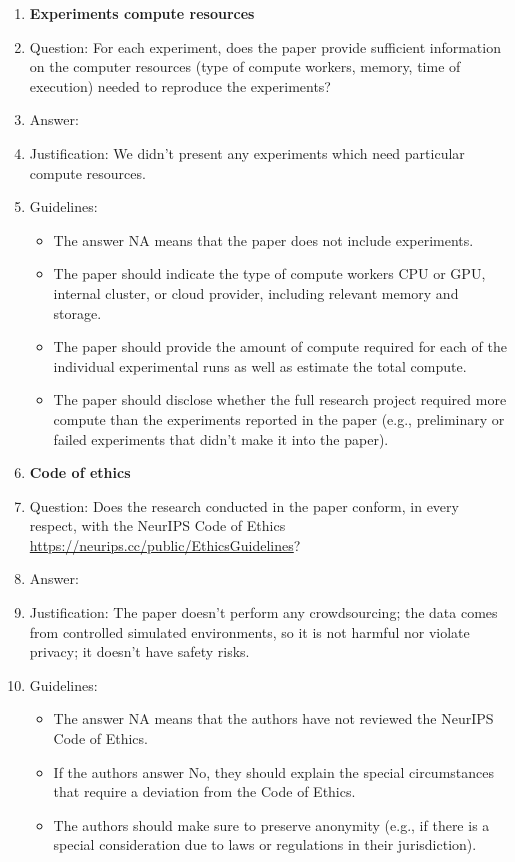 \documentclass{article}
\begin{document}
\begin{enumerate}
\item {\bf Experiments compute resources}
    \item[] Question: For each experiment, does the paper provide sufficient information on the computer resources (type of compute workers, memory, time of execution) needed to reproduce the experiments?
    \item[] Answer: \answerNA{} %
    \item[] Justification: We didn't present any experiments which need particular compute resources.
    \item[] Guidelines:
    \begin{itemize}
        \item The answer NA means that the paper does not include experiments.
        \item The paper should indicate the type of compute workers CPU or GPU, internal cluster, or cloud provider, including relevant memory and storage.
        \item The paper should provide the amount of compute required for each of the individual experimental runs as well as estimate the total compute. 
        \item The paper should disclose whether the full research project required more compute than the experiments reported in the paper (e.g., preliminary or failed experiments that didn't make it into the paper). 
    \end{itemize}
    
\item {\bf Code of ethics}
    \item[] Question: Does the research conducted in the paper conform, in every respect, with the NeurIPS Code of Ethics \url{https://neurips.cc/public/EthicsGuidelines}?
    \item[] Answer: \answerYes{} %
    \item[] Justification: The paper doesn't perform any crowdsourcing; the data comes from controlled simulated environments, so it is not harmful nor violate privacy; it doesn't have safety risks.
    \item[] Guidelines:
    \begin{itemize}
        \item The answer NA means that the authors have not reviewed the NeurIPS Code of Ethics.
        \item If the authors answer No, they should explain the special circumstances that require a deviation from the Code of Ethics.
        \item The authors should make sure to preserve anonymity (e.g., if there is a special consideration due to laws or regulations in their jurisdiction).
    \end{itemize}



\end{enumerate}
\end{document}

